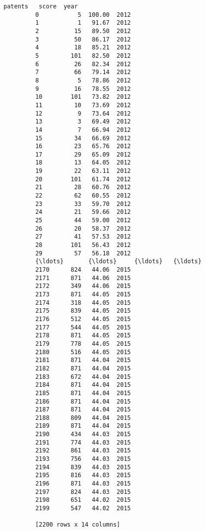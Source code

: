 \documentclass[11pt]{article}
\begin{document}
\begin{Verbatim}[commandchars=\\\{\}]
               patents   score  year  
         0           5  100.00  2012  
         1           1   91.67  2012  
         2          15   89.50  2012  
         3          50   86.17  2012  
         4          18   85.21  2012  
         5         101   82.50  2012  
         6          26   82.34  2012  
         7          66   79.14  2012  
         8           5   78.86  2012  
         9          16   78.55  2012  
         10        101   73.82  2012  
         11         10   73.69  2012  
         12          9   73.64  2012  
         13          3   69.49  2012  
         14          7   66.94  2012  
         15         34   66.69  2012  
         16         23   65.76  2012  
         17         29   65.09  2012  
         18         13   64.05  2012  
         19         22   63.11  2012  
         20        101   61.74  2012  
         21         28   60.76  2012  
         22         62   60.55  2012  
         23         33   59.70  2012  
         24         21   59.66  2012  
         25         44   59.00  2012  
         26         20   58.37  2012  
         27         41   57.53  2012  
         28        101   56.43  2012  
         29         57   56.18  2012  
         {\ldots}       {\ldots}     {\ldots}   {\ldots}  
         2170      824   44.06  2015  
         2171      871   44.06  2015  
         2172      349   44.06  2015  
         2173      871   44.05  2015  
         2174      318   44.05  2015  
         2175      839   44.05  2015  
         2176      512   44.05  2015  
         2177      544   44.05  2015  
         2178      871   44.05  2015  
         2179      778   44.05  2015  
         2180      516   44.05  2015  
         2181      871   44.04  2015  
         2182      871   44.04  2015  
         2183      672   44.04  2015  
         2184      871   44.04  2015  
         2185      871   44.04  2015  
         2186      871   44.04  2015  
         2187      871   44.04  2015  
         2188      809   44.04  2015  
         2189      871   44.04  2015  
         2190      434   44.03  2015  
         2191      774   44.03  2015  
         2192      861   44.03  2015  
         2193      756   44.03  2015  
         2194      839   44.03  2015  
         2195      816   44.03  2015  
         2196      871   44.03  2015  
         2197      824   44.03  2015  
         2198      651   44.02  2015  
         2199      547   44.02  2015  
         
         [2200 rows x 14 columns]
\end{Verbatim}
            
\end{document}

